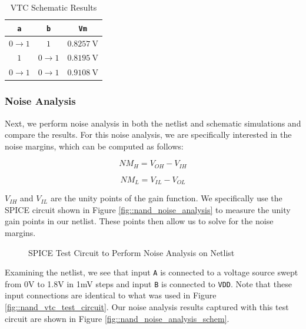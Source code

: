 \documentclass{article}
\begin{document}
	\begin{table}[H]
	\begin{center}
	\caption{VTC Schematic Results}
	\label{table::vtc_schematic}
	\begin{tabular}{| c | c | c |}
		\hline
		\texttt{a} & \texttt{b} & \texttt{Vm}\\
		\hline	
		$0 \rightarrow 1$ & $1$ & $0.8257\ \text{V}$\\
		\hline	
		$1$ & $0 \rightarrow 1$ & $0.8195\ \text{V}$\\
		\hline	
		$0 \rightarrow 1$ & $0 \rightarrow 1$ & $0.9108\ \text{V}$\\
		\hline
	\end{tabular}
	\end{center}
	\end{table}
	
	\subsubsection{Noise Analysis}
	
	Next, we perform noise analysis in both the netlist and schematic simulations and compare the results. For this noise analysis, we are specifically interested in the noise margins, which can be computed as follows:
	
	\begin{equation}
		NM_H = V_{OH} - V_{IH}
		\label{eq::nmh}
	\end{equation}
	
	 \begin{equation}
		NM_L = V_{IL} - V_{OL}
		\label{eq::nml}
	\end{equation}
	
	\noindent $V_{IH}$ and $V_{IL}$ are the unity points of the gain function. We specifically use the SPICE circuit shown in Figure \ref{fig::nand_noise_analysis} to measure the unity gain points in our netlist. These points then allow us to solve for the noise margins.	
	
	\begin{figure}[H]
		
		\caption{SPICE Test Circuit to Perform Noise Analysis on Netlist}
		\label{fig::nand_noise_analysis_test_circuit}
	\end{figure}
	
	Examining the netlist, we see that input \texttt{A} is connected to a voltage source swept from 0V to 1.8V in 1mV steps and input \texttt{B} is connected to \texttt{VDD}. Note that these input connections are identical to what was used in Figure \ref{fig::nand_vtc_test_circuit}. Our noise analysis results captured with this test circuit are shown in Figure \ref{fig::nand_noise_analysis_schem}.
	
\end{document}
